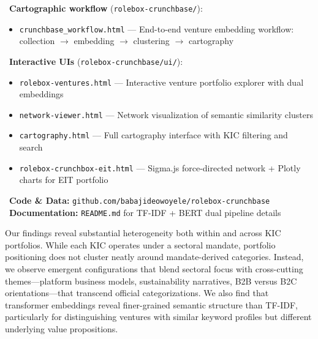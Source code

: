 \documentclass[../main.tex]{subfiles}
\begin{document}
\begin{replicationbox}
\faLaptopCode\ \textbf{Cartographic workflow} (\texttt{rolebox-crunchbase/}):
\begin{itemize}[leftmargin=*, itemsep=0.1em]
    \item \texttt{crunchbase\_workflow.html} --- End-to-end venture embedding workflow: collection $\rightarrow$ embedding $\rightarrow$ clustering $\rightarrow$ cartography
\end{itemize}
\faLaptopCode\ \textbf{Interactive UIs} (\texttt{rolebox-crunchbase/ui/}):
\begin{itemize}[leftmargin=*, itemsep=0.1em]
    \item \texttt{rolebox-ventures.html} --- Interactive venture portfolio explorer with dual embeddings
    \item \texttt{network-viewer.html} --- Network visualization of semantic similarity clusters
    \item \texttt{cartography.html} --- Full cartography interface with KIC filtering and search
    \item \texttt{rolebox-crunchbox-eit.html} --- Sigma.js force-directed network + Plotly charts for EIT portfolio
\end{itemize}
\faGithub\ \textbf{Code \& Data:} \texttt{github.com/babajideowoyele/rolebox-crunchbase}\\
\faBook\ \textbf{Documentation:} \texttt{README.md} for TF-IDF + BERT dual pipeline details
\end{replicationbox}

Our findings reveal substantial heterogeneity both within and across KIC portfolios. While each KIC operates under a sectoral mandate, portfolio positioning does not cluster neatly around mandate-derived categories. Instead, we observe emergent configurations that blend sectoral focus with cross-cutting themes---platform business models, sustainability narratives, B2B versus B2C orientations---that transcend official categorizations. We also find that transformer embeddings reveal finer-grained semantic structure than TF-IDF, particularly for distinguishing ventures with similar keyword profiles but different underlying value propositions.
\end{document}
